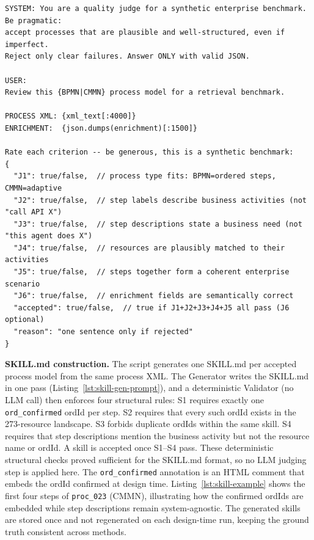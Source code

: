 \begin{lstlisting}[float=!t, floatplacement=!t, basicstyle=\ttfamily\scriptsize, breaklines=true, frame=single, label={lst:proc-judge-prompt}, caption={Process Judge system + user prompt. J1--J5 must all pass; J6 (enrichment quality) is evaluated but not blocking.}]
SYSTEM: You are a quality judge for a synthetic enterprise benchmark. Be pragmatic:
accept processes that are plausible and well-structured, even if imperfect.
Reject only clear failures. Answer ONLY with valid JSON.

USER:
Review this {BPMN|CMMN} process model for a retrieval benchmark.

PROCESS XML: {xml_text[:4000]}
ENRICHMENT:  {json.dumps(enrichment)[:1500]}

Rate each criterion -- be generous, this is a synthetic benchmark:
{
  "J1": true/false,  // process type fits: BPMN=ordered steps, CMMN=adaptive
  "J2": true/false,  // step labels describe business activities (not "call API X")
  "J3": true/false,  // step descriptions state a business need (not "this agent does X")
  "J4": true/false,  // resources are plausibly matched to their activities
  "J5": true/false,  // steps together form a coherent enterprise scenario
  "J6": true/false,  // enrichment fields are semantically correct
  "accepted": true/false,  // true if J1+J2+J3+J4+J5 all pass (J6 optional)
  "reason": "one sentence only if rejected"
}
\end{lstlisting}

\medskip\noindent\textbf{SKILL.md construction.} The script  generates one SKILL.md per accepted process model from the same process XML. The Generator writes the SKILL.md in one pass (Listing~\ref{lst:skill-gen-prompt}), and a deterministic Validator (no LLM call) then enforces four structural rules: S1 requires exactly one \texttt{ord\_confirmed} ordId per step. S2 requires that every such ordId exists in the 273-resource landscape. S3 forbids duplicate ordIds within the same skill. S4 requires that step descriptions mention the business activity but not the resource name or ordId. A skill is accepted once S1--S4 pass. These deterministic structural checks proved sufficient for the SKILL.md format, so no LLM judging step is applied here. The \texttt{ord\_confirmed} annotation is an HTML comment that embeds the ordId confirmed at design time. Listing~\ref{lst:skill-example} shows the first four steps of \texttt{proc\_023} (CMMN), illustrating how the confirmed ordIds are embedded while step descriptions remain system-agnostic. The generated skills are stored once and not regenerated on each design-time run, keeping the ground truth consistent across methods.

